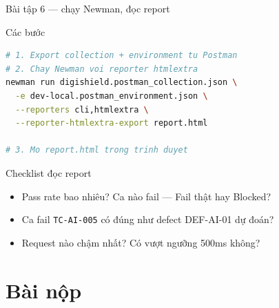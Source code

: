 \documentclass[aspectratio=169,12pt]{beamer}
\begin{document}
\begin{frame}[fragile]{Bài tập 6 --- chạy Newman, đọc report}
  \begin{block}{Các bước}
\begin{lstlisting}[language=bash]
# 1. Export collection + environment tu Postman
# 2. Chay Newman voi reporter htmlextra
newman run digishield.postman_collection.json \
  -e dev-local.postman_environment.json \
  --reporters cli,htmlextra \
  --reporter-htmlextra-export report.html

# 3. Mo report.html trong trinh duyet
\end{lstlisting}
  \end{block}

  \begin{block}{Checklist đọc report}
    \begin{itemize}
      \item Pass rate bao nhiêu? Ca nào fail --- Fail thật hay Blocked?
      \item Ca fail \texttt{TC-AI-005} có đúng như defect DEF-AI-01 dự đoán?
      \item Request nào chậm nhất? Có vượt ngưỡng 500ms không?
    \end{itemize}
  \end{block}
\end{frame}

\section{Bài nộp}
\end{document}
